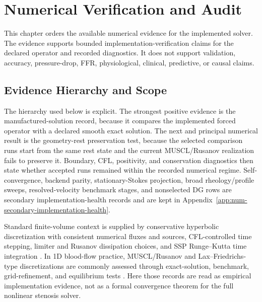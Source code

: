 \section{Numerical Verification and Audit}
\label{sec:numerical-verification}

This chapter orders the available numerical evidence for the implemented solver.
The evidence supports bounded implementation-verification claims for the declared
operator and recorded diagnostics. It does not support validation, accuracy,
pressure-drop, FFR, physiological, clinical, predictive, or causal claims.

\subsection{Evidence Hierarchy and Scope}
\label{subsec:verification-scope-convergence-stability}

The hierarchy used below is explicit. The strongest positive evidence is the
manufactured-solution record, because it compares the implemented forced
operator with a declared smooth exact solution. The next and principal numerical
result is the geometry-rest preservation test, because the selected comparison
runs start from the same rest state and the current MUSCL/Rusanov realization
fails to preserve it. Boundary, CFL, positivity, and conservation diagnostics
then state whether accepted runs remained within the recorded numerical regime.
Self-convergence, backend parity, stationary-Stokes projection, broad
rheology/profile sweeps, resolved-velocity benchmark stages, and nonselected DG
rows are secondary implementation-health records and are kept in
Appendix~\ref{app:num-secondary-implementation-health}.

Standard finite-volume context is supplied by conservative hyperbolic
discretization with consistent numerical fluxes and sources, CFL-controlled time
stepping, limiter and Rusanov dissipation choices, and SSP Runge--Kutta time
integration \cite{LeVeque2002FiniteVolumeMethodsForHyperbolicProblems}. In 1D
blood-flow practice, MUSCL/Rusanov and Lax--Friedrichs-type discretizations are
commonly assessed through exact-solution, benchmark, grid-refinement, and
equilibrium tests
\cite{Wang2014BloodFlowNetworks,BeckersKolbe2025LaxFriedrichsHemodynamics,BoileauEtAl2015Benchmark,BenemeritoEtAl2024OpenBF,LuccaEtAl2025FFRPrediction}.
Here those records are read as empirical implementation evidence, not as a
formal convergence theorem for the full nonlinear stenosis solver.

